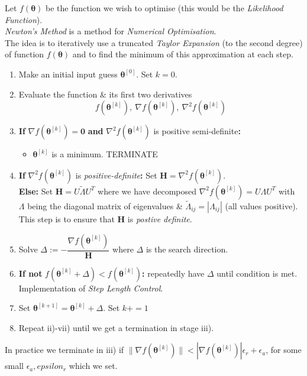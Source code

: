 \documentclass[11pt,a4paper]{article}
\begin{document}
Let $f(\pmb\theta)$ be the function we wish to optimise (this would be the \textit{Likelihood Function}).\\
\textit{Newton's Method} is a method for \textit{Numerical Optimisation}.\\
The idea is to iteratively use a truncated \textit{Taylor Expansion} (to the second degree) of function $f(\pmb\theta)$ and to find the minimum of this approximation at each step.
\begin{enumerate}
	\item Make an initial input guess $\pmb\theta^{[0]}$. Set $k=0$.
	\item Evaluate the function \& its first two derivatives
	$$f(\pmb\theta^{[k]}),\ \nabla f(\pmb\theta^{[k]}),\ \nabla^2f(\pmb\theta^{[k]})$$
	\item \textbf{If} $\nabla f(\pmb\theta^{[k]})=\pmb0$ \textbf{and} $\nabla^2f(\pmb\theta^{[k]})$ is positive semi-definite\textbf{:}
	\begin{itemize}
		\item $\pmb\theta^{[k]}$ is a minimum. TERMINATE
	\end{itemize}
	\item \textbf{If} $\nabla^2f(\pmb\theta^{[k]})$ is \textit{positive-definite}\textbf{:} Set $\textbf{H}=\nabla^2f(\pmb\theta^{[k]})$.\\
	\textbf{Else:} Set $\textbf{H}=U\tilde{\Lambda}U^T$ where we have decomposed $\nabla^2f(\pmb\theta^{[k]})=U\Lambda U^T$ with $\Lambda$ being the diagonal matrix of eigenvalues \& $\tilde{\Lambda}_{ij}=|\Lambda_{ij}|$ (all values positive).\\
	\nb This step is to ensure that $\textbf{H}$ is \textit{postive definite}.
	\item Solve $\Delta:=-\dfrac{\nabla f(\pmb\theta^{[k]})}{\textbf{H}}$ where $\Delta$ is the search direction.
	\item \textbf{If not} $f(\pmb\theta^{[k]}+\Delta)<f(\pmb\theta^{[k]})$\textbf{:} repeatedly have $\Delta$ until condition is met.\\
	\nb Implementation of \textit{Step Length Control}.
	\item Set $\pmb\theta^{[k+1]}=\pmb\theta^{[k]}+\Delta$. Set $k+=1$
	\item Repeat ii)-vii) until we get a termination in stage iii).
\end{enumerate}
\nb In practice we terminate in iii) if $\|\nabla f(\pmb\theta^{[k]})\|<|\nabla f(\pmb\theta^{[k]})|\epsilon_r+\epsilon_a$, for some small $\epsilon_a,epsilon_r$ which we set.\\
\end{document}
